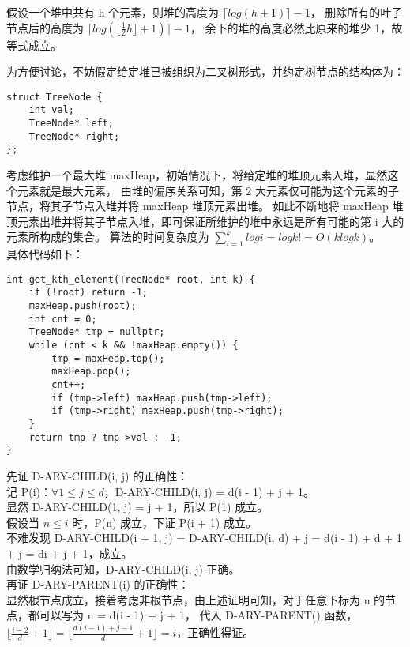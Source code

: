 \documentclass[12pt, a4paper, oneside]{ctexart}
\begin{document}
\begin{solution}[14.1]
假设一个堆中共有 h 个元素，则堆的高度为 $\lceil log(h + 1) \rceil - 1$，
删除所有的叶子节点后的高度为 $\lceil log(\lfloor \frac{1}{2} h \rfloor + 1) \rceil - 1$，
余下的堆的高度必然比原来的堆少 1，故等式成立。
\end{solution}

\begin{solution}[14.2]
为方便讨论，不妨假定给定堆已被组织为二叉树形式，并约定树节点的结构体为：
\begin{verbatim}
struct TreeNode {
    int val;
    TreeNode* left;
    TreeNode* right;
};
\end{verbatim}
考虑维护一个最大堆 maxHeap，初始情况下，将给定堆的堆顶元素入堆，显然这个元素就是最大元素，
由堆的偏序关系可知，第 2 大元素仅可能为这个元素的子节点，将其子节点入堆并将 maxHeap 堆顶元素出堆。
如此不断地将 maxHeap 堆顶元素出堆并将其子节点入堆，即可保证所维护的堆中永远是所有可能的第 i 大的元素所构成的集合。
算法的时间复杂度为 $\sum_{i = 1}^{k} logi = logk! = O(klogk)$。
\\具体代码如下：
\begin{verbatim}
int get_kth_element(TreeNode* root, int k) {  
    if (!root) return -1;
    maxHeap.push(root);
    int cnt = 0;
    TreeNode* tmp = nullptr;
    while (cnt < k && !maxHeap.empty()) {
        tmp = maxHeap.top();
        maxHeap.pop();
        cnt++;   
        if (tmp->left) maxHeap.push(tmp->left);
        if (tmp->right) maxHeap.push(tmp->right);
    }    
    return tmp ? tmp->val : -1;
}
\end{verbatim}
\end{solution}

\begin{solution}[14.3]
先证 D-ARY-CHILD(i, j) 的正确性：
\\记 P(i)：$\forall 1 \leq j \leq d$，D-ARY-CHILD(i, j) = d(i - 1) + j + 1。
\\显然 D-ARY-CHILD(1, j) = j + 1，所以 P(1) 成立。
\\假设当 $n\leq i$ 时，P(n) 成立，下证 P(i + 1) 成立。
\\不难发现 D-ARY-CHILD(i + 1, j) = D-ARY-CHILD(i, d) + j = d(i - 1) + d + 1 + j = di + j + 1，成立。
\\由数学归纳法可知，D-ARY-CHILD(i, j) 正确。
\\再证 D-ARY-PARENT(i) 的正确性：
\\显然根节点成立，接着考虑非根节点，由上述证明可知，对于任意下标为 n 的节点，都可以写为 n = d(i - 1) + j + 1，
代入 D-ARY-PARENT() 函数，$\lfloor \frac{i - 2}{d} + 1 \rfloor= \lfloor \frac{d(i - 1) + j - 1}{d} + 1 \rfloor = i$，正确性得证。
\end{solution}
\end{document}
